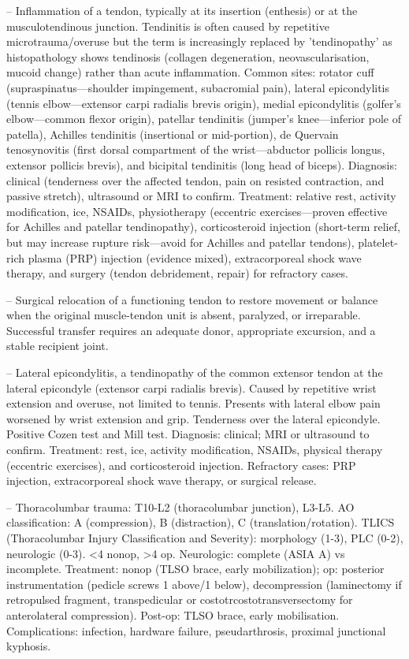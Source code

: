 -- Inflammation of a tendon, typically at its insertion (enthesis) or at the musculotendinous junction. Tendinitis is often caused by repetitive microtrauma/overuse but the term is increasingly replaced by 'tendinopathy' as histopathology shows tendinosis (collagen degeneration, neovascularisation, mucoid change) rather than acute inflammation. Common sites: rotator cuff (supraspinatus—shoulder impingement, subacromial pain), lateral epicondylitis (tennis elbow—extensor carpi radialis brevis origin), medial epicondylitis (golfer's elbow—common flexor origin), patellar tendinitis (jumper's knee—inferior pole of patella), Achilles tendinitis (insertional or mid-portion), de Quervain tenosynovitis (first dorsal compartment of the wrist—abductor pollicis longus, extensor pollicis brevis), and bicipital tendinitis (long head of biceps). Diagnosis: clinical (tenderness over the affected tendon, pain on resisted contraction, and passive stretch), ultrasound or MRI to confirm. Treatment: relative rest, activity modification, ice, NSAIDs, physiotherapy (eccentric exercises—proven effective for Achilles and patellar tendinopathy), corticosteroid injection (short-term relief, but may increase rupture risk—avoid for Achilles and patellar tendons), platelet-rich plasma (PRP) injection (evidence mixed), extracorporeal shock wave therapy, and surgery (tendon debridement, repair) for refractory cases.

-- Surgical relocation of a functioning tendon to restore movement or balance when the original muscle-tendon unit is absent, paralyzed, or irreparable. Successful transfer requires an adequate donor, appropriate excursion, and a stable recipient joint.

-- Lateral epicondylitis, a tendinopathy of the common extensor tendon at the lateral epicondyle (extensor carpi radialis brevis). Caused by repetitive wrist extension and overuse, not limited to tennis. Presents with lateral elbow pain worsened by wrist extension and grip. Tenderness over the lateral epicondyle. Positive Cozen test and Mill test. Diagnosis: clinical; MRI or ultrasound to confirm. Treatment: rest, ice, activity modification, NSAIDs, physical therapy (eccentric exercises), and corticosteroid injection. Refractory cases: PRP injection, extracorporeal shock wave therapy, or surgical release.

-- Thoracolumbar trauma: T10-L2 (thoracolumbar junction), L3-L5. AO classification: A (compression), B (distraction), C (translation/rotation). TLICS (Thoracolumbar Injury Classification and Severity): morphology (1-3), PLC (0-2), neurologic (0-3). <4 nonop, >4 op. Neurologic: complete (ASIA A) vs incomplete. Treatment: nonop (TLSO brace, early mobilization); op: posterior instrumentation (pedicle screws 1 above/1 below), decompression (laminectomy if retropulsed fragment, transpedicular or costotrcostotransversectomy for anterolateral compression). Post-op: TLSO brace, early mobilisation. Complications: infection, hardware failure, pseudarthrosis, proximal junctional kyphosis.

